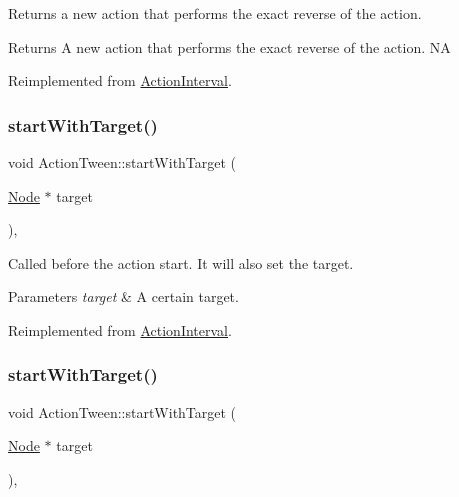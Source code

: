 Returns a new action that performs the exact reverse of the action.

\begin{DoxyReturn}{Returns}
A new action that performs the exact reverse of the action.  NA 
\end{DoxyReturn}


Reimplemented from \hyperlink{classActionInterval_a9f9ac7164036a0bc261a72f62a2b2da7}{Action\+Interval}.

\mbox{\label{classActionTween_ae530a9f86b98f8d4a336c4b0774311aa}} 
\subsubsection{\texorpdfstring{start\+With\+Target()}{startWithTarget()}\hspace{0.1cm}{\footnotesize\ttfamily [1/2]}}
{\footnotesize\ttfamily void Action\+Tween\+::start\+With\+Target (\begin{DoxyParamCaption}\item[{\hyperlink{classNode}{Node} $\ast$}]{target }\end{DoxyParamCaption})\hspace{0.3cm}{\ttfamily [override]}, {\ttfamily [virtual]}}

Called before the action start. It will also set the target.


\begin{DoxyParams}{Parameters}
{\em target} & A certain target. \\
\hline
\end{DoxyParams}


Reimplemented from \hyperlink{classActionInterval_ad3d91186b2c3108488ddbbdbbd982484}{Action\+Interval}.

\mbox{\label{classActionTween_ae530a9f86b98f8d4a336c4b0774311aa}} 
\subsubsection{\texorpdfstring{start\+With\+Target()}{startWithTarget()}\hspace{0.1cm}{\footnotesize\ttfamily [2/2]}}
{\footnotesize\ttfamily void Action\+Tween\+::start\+With\+Target (\begin{DoxyParamCaption}\item[{\hyperlink{classNode}{Node} $\ast$}]{target }\end{DoxyParamCaption})\hspace{0.3cm}{\ttfamily [override]}, {\ttfamily [virtual]}}

